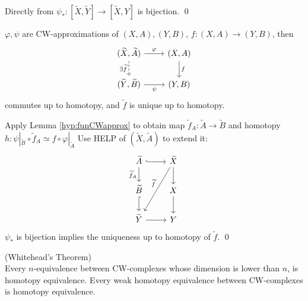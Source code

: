     \begin{prf}
        Directly from $\psi_{\ast} : [\widetilde{X},\widetilde{Y}] \to [\widetilde{X},Y]$ is bijection.
        \qed
    \end{prf}

    \begin{thm}
        $\varphi, \psi$ are CW-approximations of $(X,A), (Y,B)$,
        $f : (X,A) \to (Y,B)$, then 
        \[\begin{tikzcd}
            {(\widetilde{X},\widetilde{A})} & (X,A) \\
            {(\widetilde{Y},\widetilde{B})} & (Y,B)
            \arrow["{\exists \widetilde{f}}"', dashed, from=1-1, to=2-1]
            \arrow["\varphi", from=1-1, to=1-2]
            \arrow["f", from=1-2, to=2-2]
            \arrow["\psi"', from=2-1, to=2-2]
        \end{tikzcd}\] commutes up to homotopy,
        and $\widetilde{f}$ is unique up to homotopy.
    \end{thm}

    \begin{prf}
        Apply Lemma \ref{hyp:funCWapprox} to obtain map $\widetilde{f}_A : \widetilde{A} \to \widetilde{B}$
        and homotopy $h : \psi |_{\widetilde{B}} \circ \widetilde{f}_A \simeq f \circ \varphi|_{\widetilde{A}}$
        Use HELP of $(\widetilde{X}, \widetilde{A})$ to extend it:
        \[\begin{tikzcd}
            {\widetilde{A}} & {\widetilde{X}} \\
            {\widetilde{B}} & X \\
            {\widetilde{Y}} & Y
            \arrow[hook, from=1-1, to=1-2]
            \arrow["{\widetilde{f}_A}"', from=1-1, to=2-1]
            \arrow[hook, from=2-1, to=3-1]
            \arrow[from=3-1, to=3-2]
            \arrow[from=1-2, to=2-2]
            \arrow[from=2-2, to=3-2]
            \arrow["{\widetilde{f}}"', from=1-2, to=3-1]
        \end{tikzcd}\]
        $\psi_{\ast}$ is bijection implies the uniqueness up to homotopy of $\widetilde{f}$.
        \qed
    \end{prf}

    \begin{thm}
        (Whitehead's Theorem)\\
        Every $n$-equivalence between CW-complexes whose dimension is lower than $n$, is homotopy equivalence.
        Every weak homotopy equivalence between CW-complexes is homotopy equivalence.
    \end{thm}

